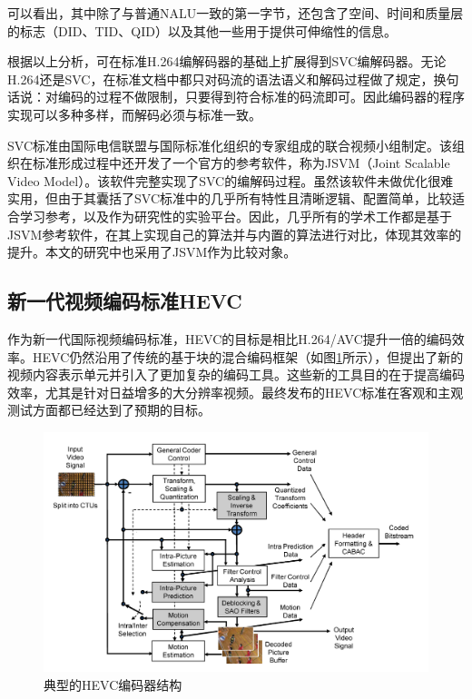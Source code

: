 可以看出，其中除了与普通NALU一致的第一字节，还包含了空间、时间和质量层的标志（DID、TID、QID）以及其他一些用于提供可伸缩性的信息。

根据以上分析，可在标准H.264编解码器的基础上扩展得到SVC编解码器。无论H.264还是SVC，在标准文档中都只对码流的语法语义和解码过程做了规定，换句话说：对编码的过程不做限制，只要得到符合标准的码流即可。因此编码器的程序实现可以多种多样，而解码必须与标准一致。
 
SVC标准由国际电信联盟与国际标准化组织的专家组成的联合视频小组制定。该组织在标准形成过程中还开发了一个官方的参考软件，称为JSVM（Joint Scalable Video Model）\supercite{JSVM}。该软件完整实现了SVC的编解码过程。虽然该软件未做优化很难实用，但由于其囊括了SVC标准中的几乎所有特性且清晰逻辑、配置简单，比较适合学习参考，以及作为研究性的实验平台。因此，几乎所有的学术工作都是基于JSVM参考软件，在其上实现自己的算法并与内置的算法进行对比，体现其效率的提升。本文的研究中也采用了JSVM作为比较对象。

\subsection{新一代视频编码标准HEVC}

作为新一代国际视频编码标准，HEVC的目标是相比H.264/AVC提升一倍的编码效率。HEVC仍然沿用了传统的基于块的混合编码框架（如图\ref{fig:17}\supercite{HEVC-Overview}所示），但提出了新的视频内容表示单元并引入了更加复杂的编码工具。这些新的工具目的在于提高编码效率，尤其是针对日益增多的大分辨率视频。最终发布的HEVC标准在客观和主观测试方面都已经达到了预期的目标。

\begin{figure}[h]
	\centering
	\includegraphics[width = 1.0\linewidth]{clip/17.png}
	\caption{典型的HEVC编码器结构\label{fig:17}}
\end{figure}

